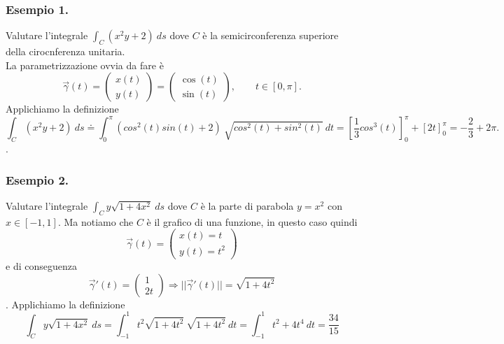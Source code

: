 \documentclass[10pt]{article}
\theoremstyle{plain}
\theoremstyle{definition}
\begin{document}
\subsubsection{Esempio 1.}
Valutare l'integrale $\int_C(x^2y+2)\ ds$ dove $C$ è la semicirconferenza superiore della cirocnferenza unitaria.
\\ La parametrizzazione ovvia da fare è
$$\vec{\gamma}(t)=\left( \begin{matrix}x(t) \\ y(t) \end{matrix} \right) 
= \left( \begin{matrix} \cos(t) \\ \sin(t) \end{matrix} \right), \qquad t\in [0, \pi]. 
$$
Applichiamo la definizione
$$\int_C(x^2y+2)\ ds \doteq \int_0^{\pi}(cos^2(t)sin(t)+2)\ \sqrt{cos^2(t)+sin^2(t)}\ dt =[\frac{1}{3}cos^3(t)]_0^\pi+[2t]_0^\pi=-\frac{2}{3}+2\pi.$$.
\subsubsection{Esempio 2.}
Valutare l'integrale $\int_Cy\sqrt{1+4x^2}\ ds$ dove $C$ è la parte di parabola $y=x^2$ con $x\in [-1,1]$. Ma notiamo che $C$ è il grafico di una funzione, in questo caso quindi
$$\vec{\gamma}(t)=\left( \begin{matrix}x(t) = t \\ y(t) = t^2 \end{matrix} \right) 
$$
e di conseguenza
$$\vec{\gamma}'(t)=\left( \begin{matrix}1 \\ 2t \end{matrix} \right) \Longrightarrow ||\vec{\gamma}'(t)||=\sqrt{1+4t^2}
$$.
Applichiamo la definizione
$$\int_Cy\sqrt{1+4x^2}\ ds=\int_{-1}^1t^2\sqrt{1+4t^2}\ \sqrt{1+4t^2}\ dt =
\int_{-1}^1 t^2+4t^4\ dt = \frac{34}{15}
$$
\end{document}
